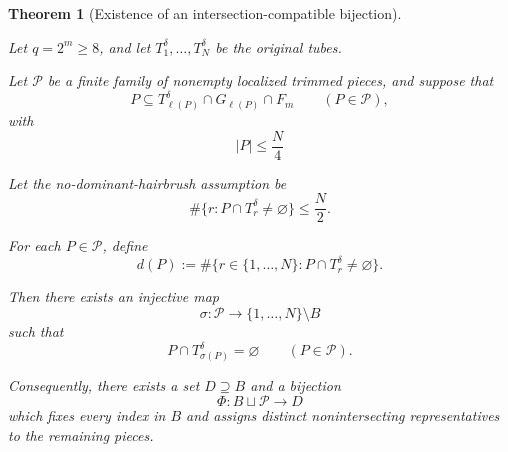 \documentclass[11pt, letterpaper]{nyjm}
\newtheorem{theorem}{Theorem}[section]
\begin{document}
\begin{theorem}[Existence of an intersection-compatible bijection]
	\label{thm:restricted-bijection}
	
	
	Let $q=2^m\ge 8$, and let
	$T_1^\delta,\ldots,T_N^\delta$ be the original tubes.
	
	Let $\mathcal P$ be a finite family of nonempty
	localized trimmed pieces, 
	and suppose that
	\[
	P\subseteq T_{\ell(P)}^\delta
	\cap G_{\ell(P)}\cap F_m
	\qquad(P\in\mathcal P),
	\]
	with 
	\[
	|P| \leq \frac N4
	\]
	
	Let the no-dominant-hairbrush assumption be
	\[
	\#\{r:P\cap T_r^\delta\ne\varnothing\}
	\le \frac N2.
	\]
	
	For each $P\in\mathcal P$, define
	\[
	d(P):=
	\#\{r\in\{1,\ldots,N\}:
	P\cap T_r^\delta\ne\varnothing\}.
	\]
	
	
	Then there exists an injective map
	\[
	\sigma:\mathcal P\longrightarrow
	\{1,\ldots,N\}\setminus B
	\]
	such that
	\[
	P\cap T_{\sigma(P)}^\delta=\varnothing
	\qquad(P\in\mathcal P).
	\]
	
	Consequently, there exists a set
	$D\supseteq B$ and a bijection
	\[
	\Phi:B\sqcup\mathcal P\longrightarrow D
	\]
	which fixes every index in $B$ and assigns
	distinct nonintersecting representatives
	to the remaining pieces.
	
\end{theorem}
\end{document}
